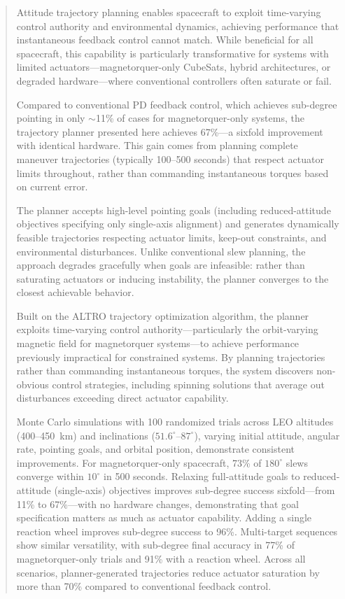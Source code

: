 \documentclass[conference]{IEEEtran}
\begin{document}
\begin{abstract}
Attitude trajectory planning enables spacecraft to exploit time-varying control authority and environmental dynamics, achieving performance that instantaneous feedback control cannot match. While beneficial for all spacecraft, this capability is particularly transformative for systems with limited actuators---magnetorquer-only CubeSats, hybrid architectures, or degraded hardware---where conventional controllers often saturate or fail.

Compared to conventional PD feedback control, which achieves sub-degree pointing in only $\sim$11\% of cases for magnetorquer-only systems, the trajectory planner presented here achieves 67\%---a sixfold improvement with identical hardware. This gain comes from planning complete maneuver trajectories (typically 100--500 seconds) that respect actuator limits throughout, rather than commanding instantaneous torques based on current error.

The planner accepts high-level pointing goals (including reduced-attitude objectives specifying only single-axis alignment) and generates dynamically feasible trajectories respecting actuator limits, keep-out constraints, and environmental disturbances. Unlike conventional slew planning, the approach degrades gracefully when goals are infeasible: rather than saturating actuators or inducing instability, the planner converges to the closest achievable behavior.

Built on the ALTRO trajectory optimization algorithm, the planner exploits time-varying control authority---particularly the orbit-varying magnetic field for magnetorquer systems---to achieve performance previously impractical for constrained systems. By planning trajectories rather than commanding instantaneous torques, the system discovers non-obvious control strategies, including spinning solutions that average out disturbances exceeding direct actuator capability.

Monte Carlo simulations with 100 randomized trials across LEO altitudes (400--450~km) and inclinations ($51.6^\circ$--$87^\circ$), varying initial attitude, angular rate, pointing goals, and orbital position, demonstrate consistent improvements. For magnetorquer-only spacecraft, 73\% of $180^\circ$ slews converge within $10^\circ$ in 500 seconds. Relaxing full-attitude goals to reduced-attitude (single-axis) objectives improves sub-degree success sixfold---from 11\% to 67\%---with no hardware changes, demonstrating that goal specification matters as much as actuator capability. Adding a single reaction wheel improves sub-degree success to 96\%. Multi-target sequences show similar versatility, with sub-degree final accuracy in 77\% of magnetorquer-only trials and 91\% with a reaction wheel. Across all scenarios, planner-generated trajectories reduce actuator saturation by more than 70\% compared to conventional feedback control.


\end{abstract}
\end{document}
